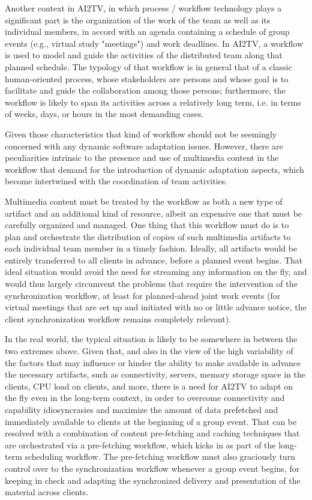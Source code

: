 \documentclass[12pt]{article}
\begin{document}
Another context in AI2TV, in which process / workflow technology plays
a significant part is the organization of the work of the team as well
as its individual members, in accord with an agenda containing a
schedule of group events (e.g., virtual study "meetings") and work
deadlines. In AI2TV, a workflow is used to model and guide the
activities of the distributed team along that planned schedule. The
typology of that workflow is in general that of a classic
human-oriented process, whose stakeholders are persons and whose goal
is to facilitate and guide the collaboration among those persons;
furthermore, the workflow is likely to span its activities across a
relatively long term, i.e. in terms of weeks, days, or hours in the
most demanding cases.

Given those characteristics that kind of workflow should not be
seemingly concerned with any dynamic software adaptation
issues. However, there are peculiarities intrinsic to the presence and
use of multimedia content in the workflow that demand for the
introduction of dynamic adaptation aspects, which become intertwined
with the coordination of team activities.

Multimedia content must be treated by the workflow as both a new type
of artifact and an additional kind of resource, albeit an expensive
one that must be carefully organized and managed. One thing that this
workflow must do is to plan and orchestrate the distribution of copies
of such multimedia artifacts to each individual team member in a
timely fashion. Ideally, all artifacts would be entirely transferred
to all clients in advance, before a planned event begins. That ideal
situation would avoid the need for streaming any information on the
fly, and would thus largely circumvent the problems that require the
intervention of the synchronization workflow, at least for
planned-ahead joint work events (for virtual meetings that are set up
and initiated with no or little advance notice, the client
synchronization workflow remains completely relevant).

In the real world, the typical situation is likely to be somewhere in
between the two extremes above. Given that, and also in the view of
the high variability of the factors that may influence or hinder the
ability to make available in advance the necessary artifacts, such as
connectivity, servers, memory storage space in the clients, CPU load
on clients, and more, there is a need for AI2TV to adapt on the fly
even in the long-term context, in order to overcome connectivity and
capability idiosyncrasies and maximize the amount of data prefetched
and immediately available to clients at the beginning of a group
event. That can be resolved with a combination of content pre-fetching
and caching techniques that are orchestrated via a pre-fetching
workflow, which kicks in as part of the long-term scheduling
workflow. The pre-fetching workflow must also graciously turn control
over to the synchronization workflow whenever a group event begins,
for keeping in check and adapting the synchronized delivery and
presentation of the material across clients.
\end{document}
